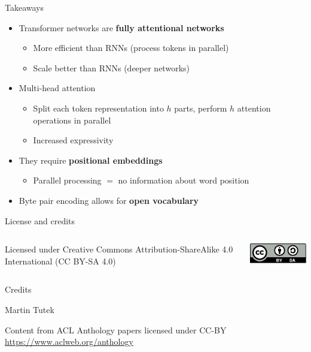 \documentclass[12pt,aspectratio=169,handout]{beamer}
\begin{document}
\begin{frame}{Takeaways}
	
\begin{itemize}
	\item Transformer networks are \textbf{fully attentional networks}
	\begin{itemize}
		\item More efficient than RNNs (process tokens in parallel)
		\item Scale better than RNNs (deeper networks)
	\end{itemize}
	\item Multi-head attention
	\begin{itemize}
		\item Split each token representation into $h$ parts, perform $h$ attention operations in parallel
		\item Increased expressivity
	\end{itemize}
	
	\item They require \textbf{positional embeddings}
	\begin{itemize}
		\item Parallel processing $=$ no information about word position
	\end{itemize}
	\item Byte pair encoding allows for \textbf{open vocabulary}
\end{itemize}
	
\end{frame}



\begin{frame}{License and credits}

	\begin{columns}
		\begin{column}{0.7\textwidth}
			Licensed under Creative Commons Attribution-ShareAlike 4.0 International (CC BY-SA 4.0)
		\end{column}
		\begin{column}{0.2\textwidth}
			\includegraphics[width=0.9\linewidth]{img/cc-by-sa-icon.pdf}
		\end{column}
	\end{columns}
	
	\bigskip
	
	Credits
	
	\begin{scriptsize}
		
		Martin Tutek
		
		Content from ACL Anthology papers licensed under CC-BY \url{https://www.aclweb.org/anthology}
		
	
	\end{scriptsize}
	
\end{frame}
\end{document}
